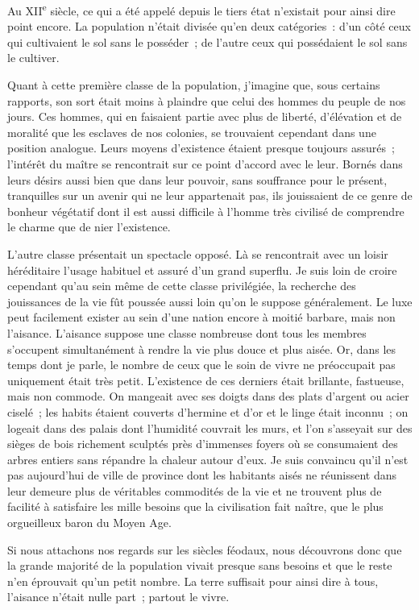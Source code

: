 \documentclass[twoside]{book} %
\begin{document}
\noindent Au XII\textsuperscript{e} siècle, ce qui a été appelé depuis le tiers état n’existait pour ainsi dire point encore. La population n’était divisée qu’en deux catégories : d’un côté ceux qui cultivaient le sol sans le posséder ; de l’autre ceux qui possédaient le sol sans le cultiver.\par
Quant à cette première classe de la population, j’imagine que, sous certains rapports, son sort était moins à plaindre que celui des hommes du peuple de nos jours. Ces hommes, qui en faisaient partie avec plus de liberté, d’élévation et de moralité que les esclaves de nos colonies, se trouvaient cependant dans une position analogue. Leurs moyens d’existence étaient presque toujours assurés ; l’intérêt du maître se rencontrait sur ce point d’accord avec le leur. Bornés dans leurs désirs aussi bien que dans leur pouvoir, sans souffrance pour le présent, tranquilles sur un avenir qui ne leur appartenait pas, ils jouissaient de ce genre de bonheur végétatif dont il est aussi difficile à l’homme très civilisé de comprendre le charme que de nier l’existence.\par
L'autre classe présentait un spectacle opposé. Là se rencontrait avec un loisir héréditaire l’usage habituel et assuré d’un grand superflu. Je suis loin de croire cependant qu’au sein même de cette classe privilégiée, la recherche des jouissances de la vie fût poussée aussi loin qu’on le suppose généralement. Le luxe peut facilement exister au sein d’une nation encore à moitié barbare, mais non l’aisance. L'aisance suppose une classe nombreuse dont tous les membres s’occupent simultanément à rendre la vie plus douce et plus aisée. Or, dans les temps dont je parle, le nombre de ceux que le soin de vivre ne préoccupait pas uniquement était très petit. L’existence de ces derniers était brillante, fastueuse, mais non commode. On mangeait avec ses doigts dans des plats d’argent ou acier ciselé ; les habits étaient couverts d’hermine et d’or et le linge était inconnu ; on logeait dans des palais dont l’humidité couvrait les murs, et l’on s’asseyait sur des sièges de bois richement sculptés près d’immenses foyers où se consumaient des arbres entiers sans répandre la chaleur autour d’eux. Je suis convaincu qu’il n’est pas aujourd’hui de ville de province dont les habitants aisés ne réunissent dans leur demeure plus de véritables commodités de la vie et ne trouvent plus de facilité à satisfaire les mille besoins que la civilisation fait naître, que le plus orgueilleux baron du Moyen Age.\par
Si nous attachons nos regards sur les siècles féodaux, nous découvrons donc que la grande majorité de la population vivait presque sans besoins et que le reste n’en éprouvait qu’un petit nombre. La terre suffisait pour ainsi dire à tous, l’aisance n’était nulle part ; partout le vivre.\par
\end{document}
